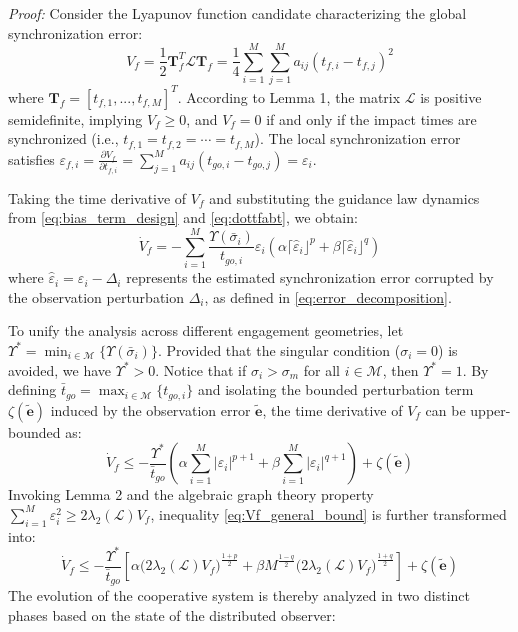 \documentclass[lettersize,journal]{IEEEtran}
\begin{document}
\textit{Proof:} Consider the Lyapunov function candidate characterizing the global synchronization error:
\begin{equation}
	\label{eq:Lyapunov_guidance}
	V_f = \frac{1}{2} \boldsymbol{T}_{f}^T \mathcal{L} \boldsymbol{T}_{f} = \frac{1}{4} \sum_{i=1}^{M} \sum_{j=1}^{M} a_{ij} (t_{f,i} - t_{f,j})^2
\end{equation}
where $\boldsymbol{T}_{f}=[t_{f,1},...,t_{f,M}]^T$. According to Lemma 1, the matrix $\mathcal{L}$ is positive semidefinite, implying $V_f \ge 0$, and $V_f=0$ if and only if the impact times are synchronized (i.e., $t_{f,1}=t_{f,2} =\cdots=t_{f,M}$). The local synchronization error satisfies $\varepsilon_{f,i} = \frac{\partial V_f}{\partial t_{f,i}} = \sum_{j=1}^{M} a_{ij} (t_{go,i} - t_{go,j}) = \varepsilon_{i}$.

Taking the time derivative of $V_f$ and substituting the guidance law dynamics from \eqref{eq:bias_term_design} and \eqref{eq:dottfabt}, we obtain:
\begin{equation}
	\label{eq:V_dot_substituted}
	\dot{V}_f = - \sum_{i=1}^{M} \frac{\Upsilon(\bar{\sigma}_i)}{t_{go,i}} \varepsilon_{i} \left( \alpha \lceil \hat{\varepsilon}_i \rfloor^p + \beta \lceil \hat{\varepsilon}_i \rfloor^q \right)
\end{equation}
where $\hat{\varepsilon}_i = \varepsilon_i - \Delta_i$ represents the estimated synchronization error corrupted by the observation perturbation $\Delta_i$, as defined in \eqref{eq:error_decomposition}.

To unify the analysis across different engagement geometries, let $\Upsilon^* = \min_{i \in \mathcal{M}} \{\Upsilon(\bar{\sigma}_i)\}$. Provided that the singular condition ($\sigma_i = 0$) is avoided, we have $\Upsilon^* > 0$. Notice that if $\sigma_i > \sigma_m$ for all $i \in \mathcal{M}$, then $\Upsilon^* = 1$. By defining $\bar{t}_{go} = \max_{i \in \mathcal{M}}\{t_{go,i}\}$ and isolating the bounded perturbation term $\zeta(\tilde{\mathbf{e}})$ induced by the observation error $\tilde{\mathbf{e}}$, the time derivative of $V_f$ can be upper-bounded as:
\begin{equation}
	\label{eq:Vf_general_bound}
	\dot{V}_f \leq -\frac{\Upsilon^*}{\bar{t}_{go}} \left( \alpha \sum_{i=1}^{M} |\varepsilon_i|^{p+1} + \beta \sum_{i=1}^{M} |\varepsilon_i|^{q+1} \right) + \zeta(\tilde{\mathbf{e}})
\end{equation}
Invoking Lemma 2 and the algebraic graph theory property $\sum_{i=1}^{M} \varepsilon_{i}^{2} \ge 2 \lambda_2(\mathcal{L}) V_f$, inequality \eqref{eq:Vf_general_bound} is further transformed into:
\begin{equation}
	\label{eq:dotvflambda}
	\dot{V}_f \leq -\frac{\Upsilon^*}{\bar{t}_{go}} \left[ \alpha \bigl(2\lambda_2(\mathcal{L}) V_f\bigr)^{\frac{1+p}{2}} + \beta M^{\frac{1-q}{2}} \bigl(2\lambda_2(\mathcal{L}) V_f\bigr)^{\frac{1+q}{2}} \right] + \zeta(\tilde{\mathbf{e}})
\end{equation}
The evolution of the cooperative system is thereby analyzed in two distinct phases based on the state of the distributed observer:
\end{document}
